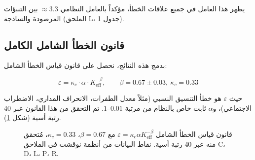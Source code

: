 \documentclass[11pt,a4paper]{article}
\newcommand{\Keff}{K_{\mathrm{eff}}}
\newcommand{\kappac}{\kappa_c}
\newcommand{\eps}{\varepsilon}
\begin{document}
	يظهر هذا العامل في جميع علاقات الخطأ، مؤكداً بالعامل النظامي \(\approx 3.3\) بين التنبؤات المرصودة والساذجة (الملحق L، جدول 1).
	
	\subsection{قانون الخطأ الشامل الكامل}
	
	بدمج هذه النتائج، نحصل على قانون قياس الخطأ الشامل:
	
	\begin{equation}
		\boxed{\eps = \kappac \cdot \alpha \cdot \Keff^{-\beta}, \qquad \beta = 0.67 \pm 0.03, \ \kappac = 0.33}
		\label{eq:universal-error}
	\end{equation}
	
	حيث \(\eps\) هو خطأ التنسيق النسبي (مثلاً معدل الطفرات، الانحراف المداري، الاضطراب الاجتماعي)، و\(\alpha\) ثابت خاص بالنظام من مرتبة \(0.01\)--\(1\). تم التحقق من هذا القانون عبر 40 رتبة أسية (شكل \ref{fig:scaling}).
	
	\begin{figure}[htbp]
		\begin{otherlanguage}{english}
			\centering
		\end{otherlanguage}
		\caption{قانون قياس الخطأ الشامل \(\eps = \kappac \alpha \Keff^{-\beta}\) مع \(\beta=0.67\)، \(\kappac=0.33\)، مُتحقق منه عبر 40 رتبة أسية. نقاط البيانات من أنظمة نوقشت في الملاحق C، D، L، P، R.}
		\label{fig:scaling}
	\end{figure}
	
\end{document}
